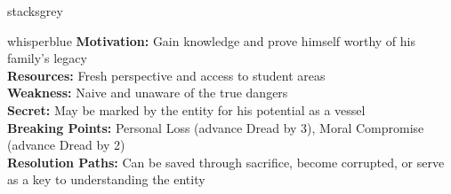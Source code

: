 \documentclass[11pt]{article}
\begin{document}
\begin{campaignsection}{stacksgrey}
\begin{npcbox}{whisperblue}
\textbf{Motivation:} Gain knowledge and prove himself worthy of his family's legacy\\
\textbf{Resources:} Fresh perspective and access to student areas\\
\textbf{Weakness:} Naive and unaware of the true dangers\\
\textbf{Secret:} May be marked by the entity for his potential as a vessel\\
\textbf{Breaking Points:} Personal Loss (advance Dread by 3), Moral Compromise (advance Dread by 2)\\
\textbf{Resolution Paths:} Can be saved through sacrifice, become corrupted, or serve as a key to understanding the entity
\end{npcbox}
\end{campaignsection}

\newpage
\end{document}
